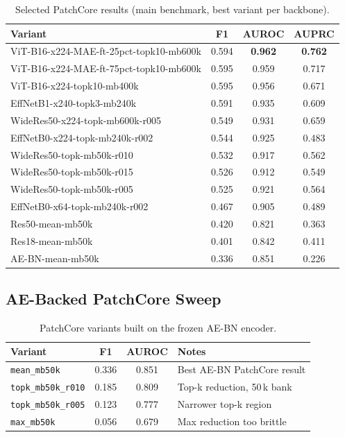 \documentclass[11pt]{article}
\begin{document}
\begin{table}[H]
\centering
\caption{Selected PatchCore results (main benchmark, best variant per backbone).}
\label{tab:appendix_patchcore}
\begin{tabular}{lccc}
\toprule
Variant & F1 & AUROC & AUPRC \\
\midrule
ViT-B16-x224-MAE-ft-25pct-topk10-mb600k & 0.594 & \textbf{0.962} & \textbf{0.762} \\
ViT-B16-x224-MAE-ft-75pct-topk10-mb600k & 0.595 & 0.959 & 0.717 \\
ViT-B16-x224-topk10-mb400k              & 0.595 & 0.956 & 0.671 \\
EffNetB1-x240-topk3-mb240k        & 0.591 & 0.935 & 0.609 \\
WideRes50-x224-topk-mb600k-r005   & 0.549 & 0.931 & 0.659 \\
EffNetB0-x224-topk-mb240k-r002    & 0.544 & 0.925 & 0.483 \\
WideRes50-topk-mb50k-r010         & 0.532 & 0.917 & 0.562 \\
WideRes50-topk-mb50k-r015         & 0.526 & 0.912 & 0.549 \\
WideRes50-topk-mb50k-r005         & 0.525 & 0.921 & 0.564 \\
EffNetB0-x64-topk-mb240k-r002     & 0.467 & 0.905 & 0.489 \\
Res50-mean-mb50k                  & 0.420 & 0.821 & 0.363 \\
Res18-mean-mb50k                  & 0.401 & 0.842 & 0.411 \\
AE-BN-mean-mb50k                  & 0.336 & 0.851 & 0.226 \\
\bottomrule
\end{tabular}
\end{table}

\subsection{AE-Backed PatchCore Sweep}

\begin{table}[H]
\centering
\caption{PatchCore variants built on the frozen AE-BN encoder.}
\label{tab:appendix_aebn_patchcore}
\begin{tabularx}{\linewidth}{lcc>{\raggedright\arraybackslash}X}
\toprule
Variant & F1 & AUROC & Notes \\
\midrule
\texttt{mean\_mb50k}       & 0.336 & 0.851 & Best AE-BN PatchCore result \\
\texttt{topk\_mb50k\_r010} & 0.185 & 0.809 & Top-k reduction, 50\,k bank \\
\texttt{topk\_mb50k\_r005} & 0.123 & 0.777 & Narrower top-k region \\
\texttt{max\_mb50k}        & 0.056 & 0.679 & Max reduction too brittle \\
\bottomrule
\end{tabularx}
\end{table}
\end{document}
